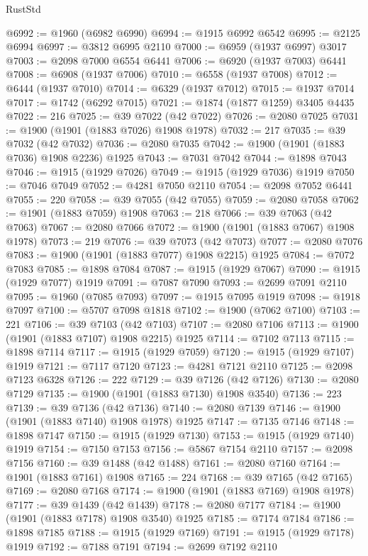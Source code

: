 \begin{lexlean}{RustStd}
\begin{coremodule}
@6992 := @1960 (@6982 @6990)
@6994 := @1915 @6992 @6542
@6995 := @2125 @6994
@6997 := @3812 @6995 @2110
@7000 := @6959 (@1937 @6997) @3017
@7003 := @2098 @7000 @6554 @6441
@7006 := @6920 (@1937 @7003) @6441
@7008 := @6908 (@1937 @7006)
@7010 := @6558 (@1937 @7008)
@7012 := @6444 (@1937 @7010)
@7014 := @6329 (@1937 @7012)
@7015 := @1937 @7014
@7017 := @1742 (@6292 @7015)
@7021 := @1874 (@1877 @1259) @3405 @4435
@7022 := 216
@7025 := @39 @7022 (@42 @7022)
@7026 := @2080 @7025
@7031 := @1900 (@1901 (@1883 @7026) @1908 @1978)
@7032 := 217
@7035 := @39 @7032 (@42 @7032)
@7036 := @2080 @7035
@7042 := @1900 (@1901 (@1883 @7036) @1908 @2236) @1925
@7043 := @7031 @7042
@7044 := @1898 @7043
@7046 := @1915 (@1929 @7026)
@7049 := @1915 (@1929 @7036) @1919
@7050 := @7046 @7049
@7052 := @4281 @7050 @2110
@7054 := @2098 @7052 @6441
@7055 := 220
@7058 := @39 @7055 (@42 @7055)
@7059 := @2080 @7058
@7062 := @1901 (@1883 @7059) @1908
@7063 := 218
@7066 := @39 @7063 (@42 @7063)
@7067 := @2080 @7066
@7072 := @1900 (@1901 (@1883 @7067) @1908 @1978)
@7073 := 219
@7076 := @39 @7073 (@42 @7073)
@7077 := @2080 @7076
@7083 := @1900 (@1901 (@1883 @7077) @1908 @2215) @1925
@7084 := @7072 @7083
@7085 := @1898 @7084
@7087 := @1915 (@1929 @7067)
@7090 := @1915 (@1929 @7077) @1919
@7091 := @7087 @7090
@7093 := @2699 @7091 @2110
@7095 := @1960 (@7085 @7093)
@7097 := @1915 @7095 @1919
@7098 := @1918 @7097
@7100 := @5707 @7098 @1818
@7102 := @1900 (@7062 @7100)
@7103 := 221
@7106 := @39 @7103 (@42 @7103)
@7107 := @2080 @7106
@7113 := @1900 (@1901 (@1883 @7107) @1908 @2215) @1925
@7114 := @7102 @7113
@7115 := @1898 @7114
@7117 := @1915 (@1929 @7059)
@7120 := @1915 (@1929 @7107) @1919
@7121 := @7117 @7120
@7123 := @4281 @7121 @2110
@7125 := @2098 @7123 @6328
@7126 := 222
@7129 := @39 @7126 (@42 @7126)
@7130 := @2080 @7129
@7135 := @1900 (@1901 (@1883 @7130) @1908 @3540)
@7136 := 223
@7139 := @39 @7136 (@42 @7136)
@7140 := @2080 @7139
@7146 := @1900 (@1901 (@1883 @7140) @1908 @1978) @1925
@7147 := @7135 @7146
@7148 := @1898 @7147
@7150 := @1915 (@1929 @7130)
@7153 := @1915 (@1929 @7140) @1919
@7154 := @7150 @7153
@7156 := @5867 @7154 @2110
@7157 := @2098 @7156
@7160 := @39 @1488 (@42 @1488)
@7161 := @2080 @7160
@7164 := @1901 (@1883 @7161) @1908
@7165 := 224
@7168 := @39 @7165 (@42 @7165)
@7169 := @2080 @7168
@7174 := @1900 (@1901 (@1883 @7169) @1908 @1978)
@7177 := @39 @1439 (@42 @1439)
@7178 := @2080 @7177
@7184 := @1900 (@1901 (@1883 @7178) @1908 @3540) @1925
@7185 := @7174 @7184
@7186 := @1898 @7185
@7188 := @1915 (@1929 @7169)
@7191 := @1915 (@1929 @7178) @1919
@7192 := @7188 @7191
@7194 := @2699 @7192 @2110

\end{coremodule}
\end{lexlean}
